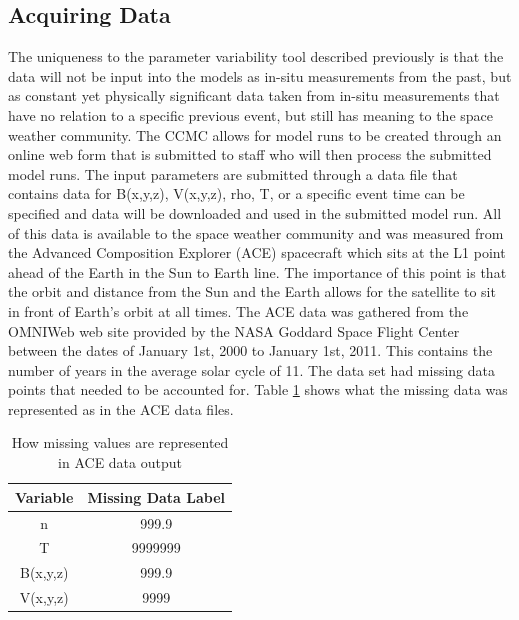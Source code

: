 \subsection{Acquiring Data}
The uniqueness to the parameter variability tool described previously is that
the data will not be input into the models as in-situ measurements from the
past, but as constant yet physically significant data taken from in-situ
measurements that have no relation to a specific previous event, but still has
meaning to the space weather community.
The CCMC allows for model runs to be created through an online web form that is
submitted to staff who will then process the submitted model runs. The input
parameters are submitted through a data file that contains data for B(x,y,z),
V(x,y,z), rho, T, or a specific event time can be specified and data will be
downloaded and used in the submitted model run.  All of this data is available
to the space weather community and was measured from the Advanced Composition
Explorer (ACE) spacecraft which sits at the L1 point ahead of the Earth in the
Sun to Earth line. The importance of this point is that the orbit and distance
from the Sun and the Earth allows for the satellite to sit in front of Earth's
orbit at all times. The ACE data was gathered from the OMNIWeb web site provided
by the NASA Goddard Space Flight Center \cite{OMNIWeb} between the dates of
January 1st, 2000 to January 1st, 2011. This contains the number of years in
the average solar cycle of 11. The data set had missing data points that needed to
be accounted for. Table \ref{table:MissingData} shows what the missing data was
represented as in the ACE data files.

\begin{table}
\begin{center}
  \caption{How missing values are represented in ACE data output}
  \begin{tabular}{| c | c | }
    \hline
    \textbf{Variable} & \textbf{Missing Data Label} \\ \hline
    n & 999.9  \\ \hline
    T & 9999999  \\ \hline
    B(x,y,z) & 999.9 \\ \hline
    V(x,y,z) & 9999 \\ \hline
  \end{tabular}
  \label{table:MissingData}
\end{center}
\end{table}

